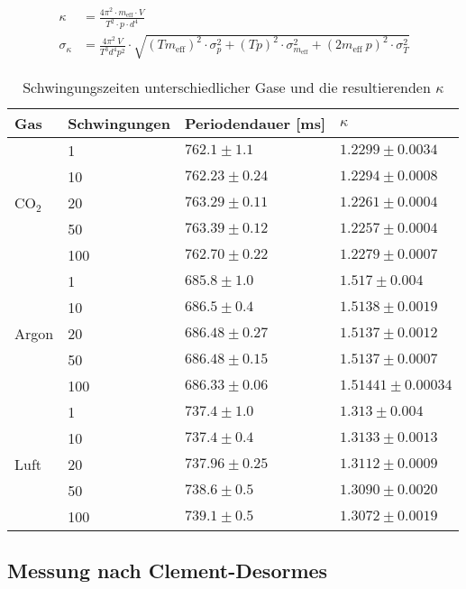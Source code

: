 \documentclass[12pt,a4paper,titlepage,headinclude,bibtotoc]{scrartcl}
\begin{document}
\begin{align*}
	\kappa&=\frac{4\pi^2 \cdot m_{\text{eff}}\cdot V }{T^{2} \cdot p \cdot d^{4}}\\
	\sigma_{\kappa}&=\frac{4\pi^2 ~ V}{T^{3}  d^{4}  p^{2}} \cdot \sqrt{\left(T  m_{\text{eff}}\right)^2 \cdot \sigma_{p}^{2} + \left(T  p\right)^2 \cdot \sigma_{m_{\text{eff}}}^{2} + \left(2m_{\text{eff}}~p\right)^{2} \cdot \sigma_{T}^{2}}
\end{align*}

\begin{table}
	\centering
	\begin{tabular}{|l|l|l|l|}
		\hline
		Gas 	&Schwingungen & Periodendauer [ms] & $\kappa$ \\\hline\hline
		
		& 1 & $762.1 \pm 1.1$ & $1.2299 \pm 0.0034$ \\
		& 10 & $762.23 \pm 0.24$ & $1.2294 \pm 0.0008$ \\
		CO$_2$
		& 20 & $763.29 \pm 0.11$ & $1.2261 \pm 0.0004$ \\
		& 50 & $763.39 \pm 0.12$ & $1.2257 \pm 0.0004$ \\
		& 100 & $762.70 \pm 0.22$ & $1.2279 \pm 0.0007$ \\\hline
		& 1 & $685.8 \pm 1.0$ & $1.517 \pm 0.004$ \\
		& 10 & $686.5 \pm 0.4$ & $1.5138 \pm 0.0019$ \\
		Argon
		& 20 & $686.48 \pm 0.27$ & $1.5137 \pm 0.0012$ \\
		& 50 & $686.48 \pm 0.15$ & $1.5137 \pm 0.0007$ \\
		& 100 & $686.33 \pm 0.06$ & $1.51441 \pm 0.00034$ \\\hline
		& 1 & $737.4 \pm 1.0$ & $1.313 \pm 0.004$ \\
		& 10 & $737.4 \pm 0.4$ & $1.3133 \pm 0.0013$ \\
		Luft
		& 20 & $737.96 \pm 0.25$ & $1.3112 \pm 0.0009$ \\
		& 50 & $738.6 \pm 0.5$ & $1.3090 \pm 0.0020$ \\
		& 100 & $739.1 \pm 0.5$ & $1.3072 \pm 0.0019$ \\\hline

	\end{tabular}
	\caption{Schwingungszeiten unterschiedlicher Gase und die resultierenden $\kappa$}
	\label{tab:schwingungszeit}
\end{table}



\subsection{Messung nach Clement-Desormes}
\end{document}
